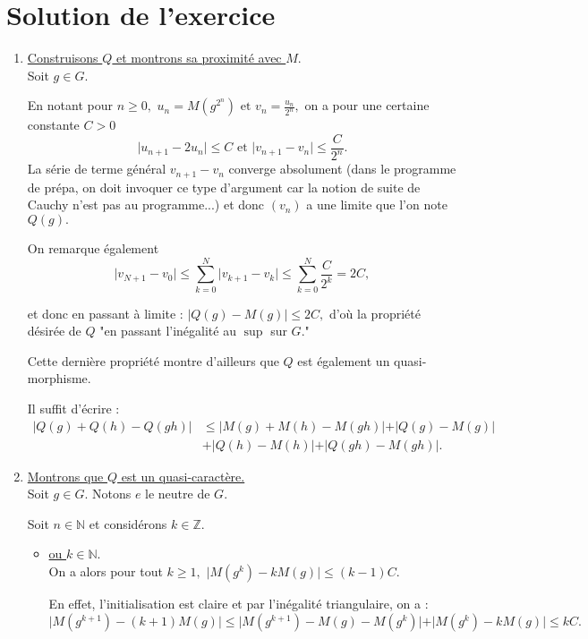 \section{Solution de l'exercice}
\begin{enumerate}
\item \underline{Construisons $Q$ et montrons sa proximité avec $M.$}\\

Soit $g\in G.$

En notant pour $n\geq 0,$ $\displaystyle u_{n}=M(g^{2^{n}}) \mbox{ et } v_{n}=\frac{u_{n}}{2^{n}},$ on a pour une certaine constante $C>0$ $$\vert u_{n+1}-2u_{n}\vert  \leq C \mbox{ et } \vert v_{n+1}-v_{n}\vert \leq \frac{C}{2^{n}}.$$
La série de terme général $v_{n+1}-v_{n}$ converge absolument (dans le programme de prépa, on doit invoquer ce type d'argument car la notion de suite de Cauchy n'est pas au programme...) et donc $(v_{n})$ a une limite que l'on note $Q(g).$

On remarque également 
$$\vert v_{N+1}-v_{0}\vert \leq \sum_{k=0}^{N}\vert v_{k+1}-v_{k}\vert\leq \sum_{k=0}^{N}\frac{C}{2^{k}}=2C,$$     

et donc en passant à limite : $\displaystyle \vert Q(g)-M(g)\vert \leq 2C,$ d'où la propriété désirée de $Q$ "en passant l'inégalité au $\sup$ sur $G.$"

Cette dernière propriété montre d'ailleurs que $Q$ est également un quasi-morphisme. 

Il suffit d'écrire : 
\begin{align*}
\vert Q(g)+Q(h)-Q(gh)\vert & \leq \vert M(g)+M(h)-M(gh)\vert +\vert Q(g)-M(g)\vert \\
& +\vert Q(h)-M(h)\vert +\vert Q(gh)-M(gh)\vert.    
\end{align*}

\item \underline{Montrons que $Q$ est un quasi-caractère.}\\

Soit $g\in G.$ Notons $e$ le neutre de $G$.

Soit $n\in \mathbb{N}$ et considérons $k\in \mathbb{Z}.$

\begin{itemize}
\item \underline{ou $k\in \mathbb{N}.$}\\

On a alors pour tout $k\geq 1,$ $\displaystyle \vert M(g^{k})-kM(g) \vert \leq (k-1)C.$

En effet, l'initialisation est claire et par l'inégalité triangulaire, on a : $$\vert M(g^{k+1})-(k+1)M(g) \vert \leq \vert M(g^{k+1})-M(g)-M(g^{k})\vert +\vert M(g^{k})-kM(g)\vert \leq kC.$$


\end{itemize}
\end{enumerate}
